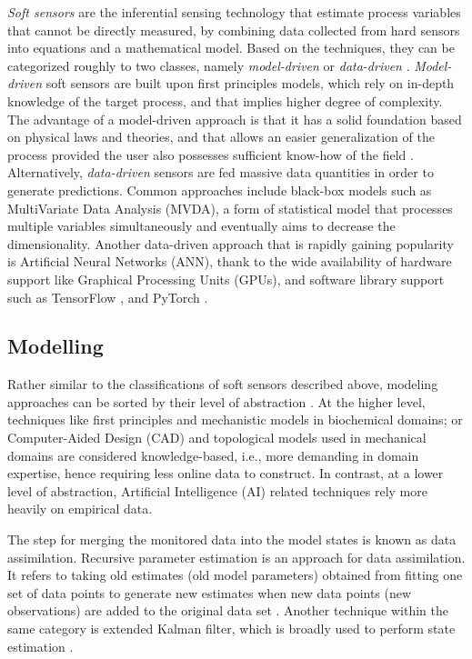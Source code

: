 \textit{Soft sensors} are the inferential sensing technology that estimate process variables that cannot be directly measured, by combining data collected from hard sensors into equations and a mathematical model. Based on the techniques, they can be categorized roughly to two classes, namely \textit{model-driven} or \textit{data-driven} \cite{Udugama2021}. \textit{Model-driven} soft sensors are built upon first principles models, which rely on in-depth knowledge of the target process, and that implies higher degree of complexity. The advantage of a model-driven approach is that it has a solid foundation based on physical laws and theories, and that allows an easier generalization of the process provided the user also possesses sufficient know-how of the field \cite{Rasheed2020}. Alternatively, \textit{data-driven} sensors are fed massive data quantities in order to generate predictions. Common approaches include black-box models such as MultiVariate Data Analysis (MVDA), a form of statistical model that processes multiple variables simultaneously and eventually aims to decrease the dimensionality. Another data-driven approach that is rapidly gaining popularity is Artificial Neural Networks (ANN), thank to the wide availability of hardware support like Graphical Processing Units (GPUs), and software library support such as TensorFlow \cite{tensorflow}, and PyTorch \cite{pytorch}.

\subsection{Modelling}
Rather similar to the classifications of soft sensors described above, modeling approaches can be sorted by their level of abstraction \cite{Narayanan2020, Zhou2021}. At the higher level, techniques like first principles and mechanistic models in biochemical domains; or Computer-Aided Design (CAD) and topological models used in mechanical domains \cite{Jiang2021} are considered knowledge-based, i.e., more demanding in domain expertise, hence requiring less online data to construct. In contrast, at a lower level of abstraction, Artificial Intelligence (AI) related techniques rely more heavily on empirical data.

The step for merging the monitored data into the model states is known as data assimilation. Recursive parameter estimation is an approach for data assimilation. It refers to taking old estimates (old model parameters) obtained from fitting one set of data points to generate new estimates when new data points (new observations) are added to the original data set \cite{Rutan1990}. Another technique within the same category is extended Kalman filter, which is broadly used to perform state estimation \cite{Oisiovici2000, Kramer2016}.

